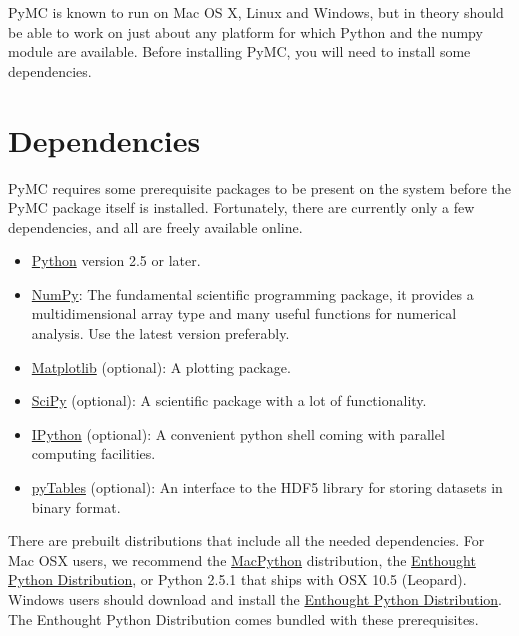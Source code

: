 


PyMC is known to run on Mac OS X, Linux and Windows, but in theory should be
able to work on just about any platform for which Python and the numpy module
are  available. Before installing PyMC, you will need to install some dependencies.



\hypertarget{dependencies}{}
\section*{Dependencies}
\label{dependencies}

PyMC requires some prerequisite packages to be present on the system before the
PyMC package itself is installed. Fortunately, there are currently only a few
dependencies, and all are freely available online.
\begin{itemize}
\item {} 
\href{http://www.python.org/.}{Python} version 2.5 or later.

\item {} 
\href{http://www.scipy.org/NumPy}{NumPy}: The fundamental scientific programming package, it provides a
multidimensional array type and many useful functions for numerical analysis.
Use the latest version preferably.

\item {} 
\href{http://matplotlib.sourceforge.net/}{Matplotlib} (optional): A plotting package.

\item {} 
\href{http://www.scipy.org/}{SciPy} (optional): A scientific package with a lot of functionality.

\item {} 
\href{http://ipython.scipy.org/}{IPython} (optional): A convenient python shell coming with parallel
computing facilities.

\item {} 
\href{http://www.pytables.org/moin}{pyTables} (optional): An interface to the HDF5 library for storing datasets
in binary format.

\end{itemize}

There are prebuilt distributions that include all the needed dependencies. For
Mac OSX users, we recommend the \href{http://www.activestate.com/Products/ActivePython/}{MacPython} distribution, the \href{http://www.enthought.com/products/epddownload.php}{Enthought Python Distribution}, or Python 2.5.1 that
ships with OSX 10.5 (Leopard). Windows users should download and install the
\href{http://www.enthought.com/products/epddownload.php}{Enthought Python Distribution}. The Enthought Python Distribution comes bundled with
these prerequisites.

